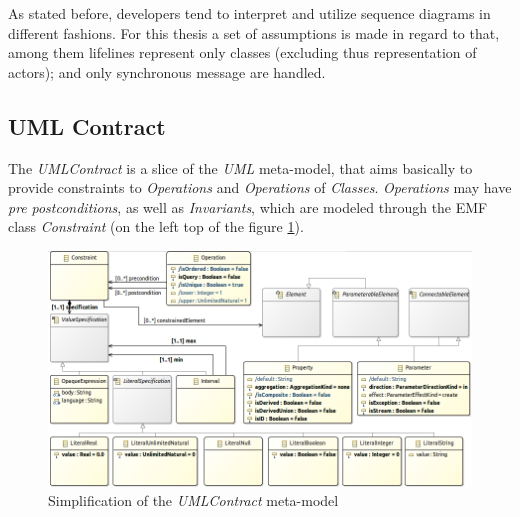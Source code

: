 \documentclass[tuberlin,cic,tc,english,noabntcite]{iiufrgs}
\begin{document}
As stated before, developers tend to interpret and utilize sequence diagrams in different fashions. For this thesis a set of assumptions is made in regard to that, among them lifelines represent only classes (excluding thus representation of actors); and only synchronous message are handled.

\subsection{UML Contract}
The \emph{UMLContract} is a slice of the \emph{UML} meta-model, that aims basically to provide constraints to \emph{Operations} and \emph{Operations} of \emph{Classes}. \emph{Operations} may have \emph{pre} \emph{postconditions}, as well as \emph{Invariants}, which are modeled through the EMF class \emph{Constraint} (on the left top of the figure \ref{fig:uml_metamodel_contracts}).

\begin{figure}[H]
    \caption{Simplification of the \emph{UMLContract} meta-model}
    \begin{center}
        \includegraphics[width=40em]{umlContractSimple01}
    \end{center}
    \label{fig:uml_metamodel_contracts}
\end{figure}
\end{document}
